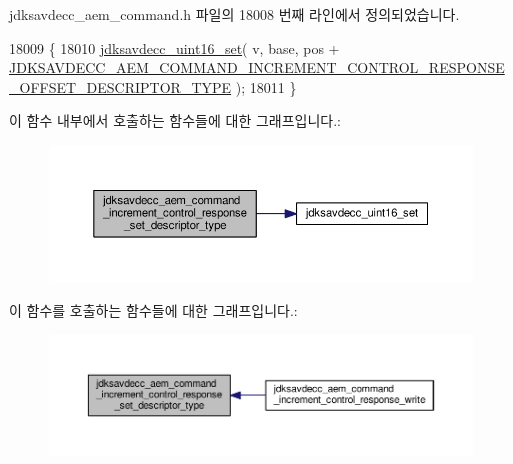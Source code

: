 jdksavdecc\+\_\+aem\+\_\+command.\+h 파일의 18008 번째 라인에서 정의되었습니다.


\begin{DoxyCode}
18009 \{
18010     \hyperlink{group__endian_ga14b9eeadc05f94334096c127c955a60b}{jdksavdecc\_uint16\_set}( v, base, pos + 
      \hyperlink{group__command__increment__control__response_gafc2d89c1261059486507e42c0f8ac92b}{JDKSAVDECC\_AEM\_COMMAND\_INCREMENT\_CONTROL\_RESPONSE\_OFFSET\_DESCRIPTOR\_TYPE}
       );
18011 \}
\end{DoxyCode}


이 함수 내부에서 호출하는 함수들에 대한 그래프입니다.\+:
\nopagebreak
\begin{figure}[H]
\begin{center}
\leavevmode
\includegraphics[width=350pt]{group__command__increment__control__response_gae72f684f142ad9e05a1facc23f51c569_cgraph}
\end{center}
\end{figure}




이 함수를 호출하는 함수들에 대한 그래프입니다.\+:
\nopagebreak
\begin{figure}[H]
\begin{center}
\leavevmode
\includegraphics[width=350pt]{group__command__increment__control__response_gae72f684f142ad9e05a1facc23f51c569_icgraph}
\end{center}
\end{figure}


